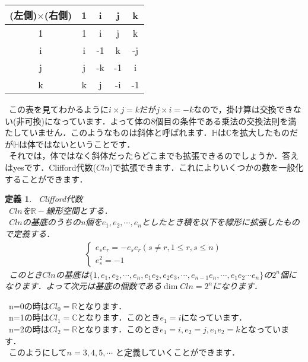 \documentclass[./main]{subfiles} %
\theoremstyle{idefinition}
\newtheorem{idefi}{定義}[section]
\begin{document}
\begin{center}
\begin{tabular}{|c|c|c|c|c|}\hline
(左側)$\times$(右側) & 1 & i & j & k \\\hline
1 & 1 & i & j & k \\\hline
i & i & -1 & k & -j \\\hline
j & j & -k & -1 & i \\\hline
k & k & j & -i & -1 \\\hline
\end{tabular}
\end{center}


\ この表を見てわかるように$i\times j=k$だが$j\times i=-k$なので，掛け算は交換できない(非可換)になっています．よって体の8個目の条件である乗法の交換法則を満たしていません．このようなものは斜体と呼ばれます．$\mathbb{H}$は$\mathbb{C}$を拡大したものだが$\mathbb{H}$は体ではないということです．\\ 

\ それでは，体ではなく斜体だったらどこまでも拡張できるのでしょうか．答えはyesです．Clifford代数($Cln$)で拡張できます．これによりいくつかの数を一般化することができます．\\

\begin{idefi}
\ Clifford代数\\
\ $Cln$を$\mathbb{R}-$線形空間とする．\\
\ $Cln$の基底のうちのn個を$e_1,e_2,\cdots ,e_n$としたとき積を以下を線形に拡張したもので定義する．\\
\begin{eqnarray}
\left\{
\begin{array}{l}
e_s e_r=-e_s e_r (s\neq r , 1\leq r,s \leq n)\\
e_s^2=-1
\end{array}
\right.
\end{eqnarray}
\ このとき$Cln$の基底は$\{1,e_1,e_2,\cdots,e_n,e_1e_2,e_2e_3,\cdots,e_{n-1}e_n,\cdots,e_1e_2\cdots e_n \}$の$2^n$個になります．よって次元は基底の個数である$\dim{Cln}=2^n$になります．\\
\end{idefi}

\ n=0の時は$Cl_0=\mathbb{R}$となります．\\
\ n=1の時は$Cl_1=\mathbb{C}$となります．このとき$e_1=i$になっています．\\
\ n=2の時は$Cl_2=\mathbb{R}$となります．このとき$e_1=i,e_2=j,e_1e_2=k$となっています．\\
\ このようにして$n=3,4,5,\cdots$ と定義していくことができます．\\
\end{document}
